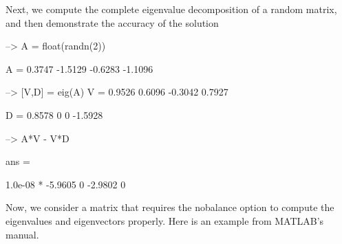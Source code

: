 Next, we compute the complete eigenvalue decomposition of a random matrix, and then demonstrate the accuracy of the solution


\begin{DoxyVerbInclude}
--> A = float(randn(2))

A = 
    0.3747   -1.5129 
   -0.6283   -1.1096 

--> [V,D] = eig(A)
V = 
    0.9526    0.6096 
   -0.3042    0.7927 

D = 
    0.8578         0 
         0   -1.5928 

--> A*V - V*D

ans = 

   1.0e-08 * 
   -5.9605         0 
   -2.9802         0 
\end{DoxyVerbInclude}


Now, we consider a matrix that requires the nobalance option to compute the eigenvalues and eigenvectors properly. Here is an example from M\-A\-T\-L\-A\-B's manual.


